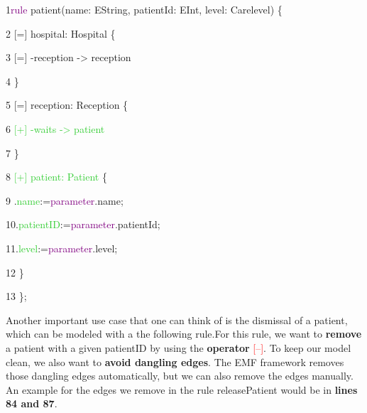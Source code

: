 {

1\hspace{0.5cm}\textcolor{Purple}{rule} patient(name: EString, patientId: EInt, level: Carelevel) \{

2\hspace{1cm}	[=] hospital: Hospital \{

3\hspace{1.5cm}	[=] -reception -> reception 

4\hspace{1cm}	\}

5\hspace{1cm}	[=] reception: Reception \{

6\hspace{1.5cm}	\textcolor{LimeGreen}{[+] -waits -> patient }

7\hspace{1cm} \}

8\hspace{1cm}	\textcolor{LimeGreen}{[+] patient: Patient} \{

9\hspace{1.5cm} .\textcolor{LimeGreen}{name}:=\textcolor{Purple}{parameter}.name;

10\hspace{1.5cm}.\textcolor{LimeGreen}{patientID}:=\textcolor{Purple}{parameter}.patientId;

11\hspace{1.5cm}.\textcolor{LimeGreen}{level}:=\textcolor{Purple}{parameter}.level;

12\hspace{1cm} \}

13\hspace{0.5cm} \}; \newline\newline

}

Another important use case that one can think of is the dismissal of a patient, which can be modeled with a the following rule.\newline For this rule, we want to \textbf{remove} a patient with a given \textsf{patientID} by using the \textbf{operator} \textcolor{red}{[--]}.\newline
To keep our model clean, we also want to \textbf{avoid dangling edges}. The EMF framework removes those dangling edges automatically, but we can also remove the edges manually.
An example for the edges we remove in the rule \textsf{releasePatient} would be in \textbf{lines 84 and 87}.\newline\newline

